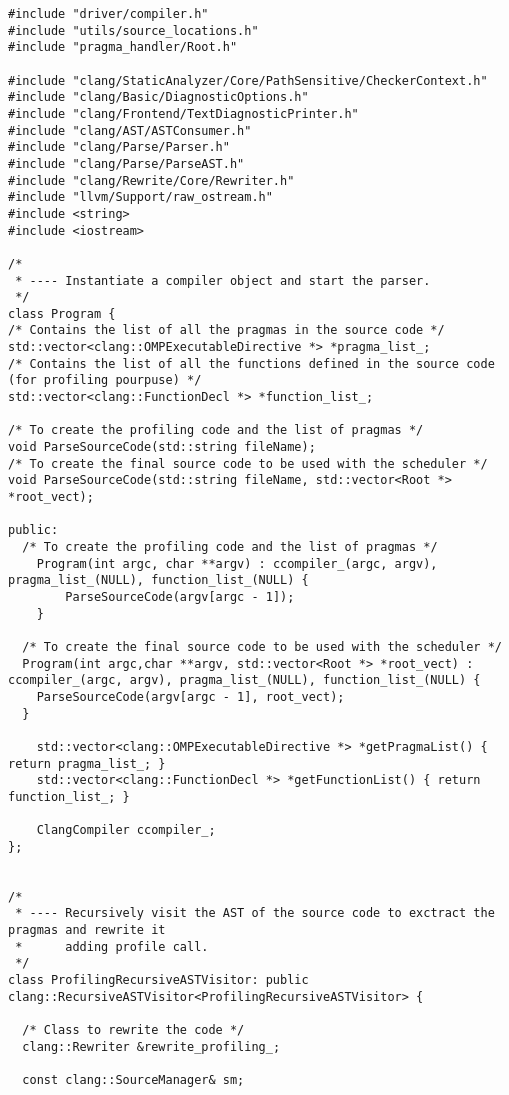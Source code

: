 \documentclass[a4paper,10pt,twoside]{book}
\begin{document}
\begin{lstlisting}[language=CCC, caption=driver/program.h]
#include "driver/compiler.h"
#include "utils/source_locations.h"
#include "pragma_handler/Root.h"

#include "clang/StaticAnalyzer/Core/PathSensitive/CheckerContext.h"
#include "clang/Basic/DiagnosticOptions.h"
#include "clang/Frontend/TextDiagnosticPrinter.h"
#include "clang/AST/ASTConsumer.h"
#include "clang/Parse/Parser.h"
#include "clang/Parse/ParseAST.h"
#include "clang/Rewrite/Core/Rewriter.h"
#include "llvm/Support/raw_ostream.h"
#include <string>
#include <iostream>

/*
 * ---- Instantiate a compiler object and start the parser. 
 */
class Program {
/* Contains the list of all the pragmas in the source code */
std::vector<clang::OMPExecutableDirective *> *pragma_list_;
/* Contains the list of all the functions defined in the source code (for profiling pourpuse) */
std::vector<clang::FunctionDecl *> *function_list_;

/* To create the profiling code and the list of pragmas */
void ParseSourceCode(std::string fileName);
/* To create the final source code to be used with the scheduler */
void ParseSourceCode(std::string fileName, std::vector<Root *> *root_vect);

public:
  /* To create the profiling code and the list of pragmas */
	Program(int argc, char **argv) : ccompiler_(argc, argv), pragma_list_(NULL), function_list_(NULL) {
		ParseSourceCode(argv[argc - 1]);
	}

  /* To create the final source code to be used with the scheduler */
  Program(int argc,char **argv, std::vector<Root *> *root_vect) : ccompiler_(argc, argv), pragma_list_(NULL), function_list_(NULL) {
    ParseSourceCode(argv[argc - 1], root_vect);
  }

	std::vector<clang::OMPExecutableDirective *> *getPragmaList() { return pragma_list_; }
	std::vector<clang::FunctionDecl *> *getFunctionList() { return function_list_; }

	ClangCompiler ccompiler_;
};


/*
 * ---- Recursively visit the AST of the source code to exctract the pragmas and rewrite it
 *      adding profile call.
 */
class ProfilingRecursiveASTVisitor: public clang::RecursiveASTVisitor<ProfilingRecursiveASTVisitor> {

  /* Class to rewrite the code */
  clang::Rewriter &rewrite_profiling_;
  
  const clang::SourceManager& sm;


\end{lstlisting}
\end{document}
